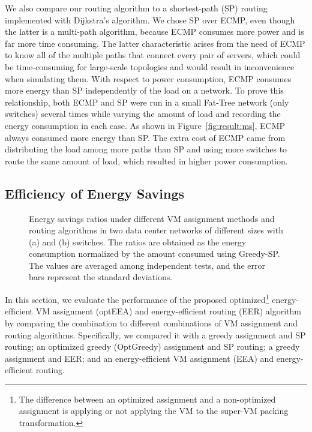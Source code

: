 \documentclass[journal,single-space,two column,twoside,10pt]{IEEEtran}
\begin{document}
We also compare our routing algorithm to a shortest-path (SP) routing implemented with Dijkstra's algorithm. We chose SP over ECMP, even though the latter is a multi-path algorithm, because ECMP consumes more power and is far more time consuming. The latter characteristic arises from the need of ECMP to know all of the multiple paths that connect every pair of servers, which could be time-consuming for large-scale topologies and would result in inconvenience when simulating them. With respect to power consumption, ECMP consumes more energy than SP independently of the load on a network. To prove this relationship, both ECMP and SP were run in a small Fat-Tree network (only  switches) several times while varying the amount of load and recording the energy consumption in each case. As shown in Figure~\ref{fig:result:ms}, ECMP always consumed more energy than SP. The extra cost of ECMP came from distributing the load among more paths than SP and using more switches to route the same amount of load, which resulted in higher power consumption.


\subsection{Efficiency of Energy Savings}
\begin{figure}[!t]
	\centering
	\hspace{-0.1in}
	\caption{\label{fig:result}Energy savings ratios under different VM assignment methods and routing algorithms in two data center networks of different sizes with (a)  and (b)  switches. The ratios are obtained as the energy consumption normalized by the amount consumed using Greedy-SP. The values are averaged among  independent tests, and the error bars represent the standard deviations.}
\end{figure}


In this section, we evaluate the performance of the proposed optimized\footnote{The difference between an optimized assignment and a non-optimized assignment is applying or not applying the VM to the super-VM packing transformation.} energy-efficient VM assignment (optEEA) and energy-efficient routing (EER) algorithm by comparing the combination to  different combinations of VM assignment and routing algorithms. Specifically, we compared it with a greedy assignment and SP routing; an optimized greedy (OptGreedy) assignment and SP routing; a greedy assignment and EER; and an energy-efficient VM assignment (EEA) and energy-efficient routing.
\end{document}

